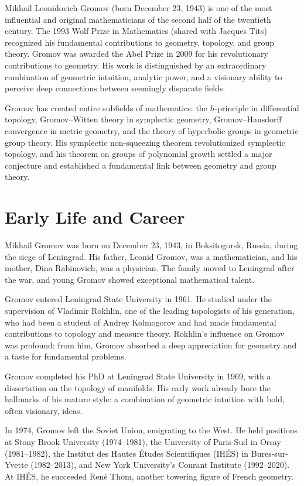 Mikhail Leonidovich Gromov (born December 23, 1943) is one of the most influential and original mathematicians of the second half of the twentieth century. The 1993 Wolf Prize in Mathematics (shared with Jacques Tits) recognized his fundamental contributions to geometry, topology, and group theory. Gromov was awarded the Abel Prize in 2009 for his revolutionary contributions to geometry. His work is distinguished by an extraordinary combination of geometric intuition, analytic power, and a visionary ability to perceive deep connections between seemingly disparate fields.

Gromov has created entire subfields of mathematics: the \(h\)-principle in differential topology, Gromov--Witten theory in symplectic geometry, Gromov--Hausdorff convergence in metric geometry, and the theory of hyperbolic groups in geometric group theory. His symplectic non-squeezing theorem revolutionized symplectic topology, and his theorem on groups of polynomial growth settled a major conjecture and established a fundamental link between geometry and group theory.

\section{Early Life and Career}

Mikhail Gromov was born on December 23, 1943, in Boksitogorsk, Russia, during the siege of Leningrad. His father, Leonid Gromov, was a mathematician, and his mother, Dina Rabinovich, was a physician. The family moved to Leningrad after the war, and young Gromov showed exceptional mathematical talent.

Gromov entered Leningrad State University in 1961. He studied under the supervision of Vladimir Rokhlin, one of the leading topologists of his generation, who had been a student of Andrey Kolmogorov and had made fundamental contributions to topology and measure theory. Rokhlin's influence on Gromov was profound: from him, Gromov absorbed a deep appreciation for geometry and a taste for fundamental problems.

Gromov completed his PhD at Leningrad State University in 1969, with a dissertation on the topology of manifolds. His early work already bore the hallmarks of his mature style: a combination of geometric intuition with bold, often visionary, ideas.

In 1974, Gromov left the Soviet Union, emigrating to the West. He held positions at Stony Brook University (1974--1981), the University of Paris-Sud in Orsay (1981--1982), the Institut des Hautes \'Etudes Scientifiques (IH\'ES) in Bures-sur-Yvette (1982--2013), and New York University's Courant Institute (1992--2020). At IH\'ES, he succeeded Ren\'e Thom, another towering figure of French geometry.

